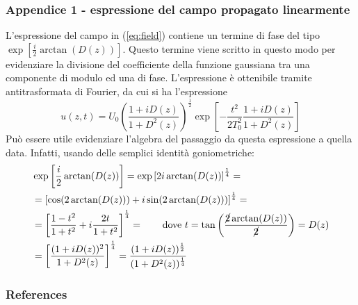 \documentclass[8pt]{beamer} %
\begin{document}
\begin{frame}[plain]
    \frametitle{Appendice 1 - espressione del campo propagato linearmente}
    L'espressione del campo in (\ref{eq:field}) contiene un termine di fase del tipo $\exp\left[\frac{i}{2} \arctan(D(z)) \right]$. Questo termine viene scritto in questo modo per evidenziare la divisione del coefficiente della funzione gaussiana tra una componente di modulo ed una di fase. L'espressione è ottenibile tramite antitrasformata di Fourier, da cui si ha l'espressione
    \begin{equation}
        u(z, t) = U_0 \left(\dfrac{1+iD(z)}{1+D^2(z)}\right)^{\frac{1}{2}} \exp\left[-\dfrac{t^2}{2T_0^2} \dfrac{1+iD(z)}{1+D^2(z)}\right]
    \end{equation}
    Può essere utile evidenziare l'algebra del passaggio da questa espressione a quella data. Infatti, usando delle semplici identità goniometriche:
    \begin{align*}
         & \exp\left[ \dfrac{i}{2} \arctan(D(z))\right] = \exp\left[ 2i \arctan(D(z))\right]^{\frac{1}{4}}=                                                                      \\
         & =\left[\cos(2\arctan(D(z))) + i \sin(2\arctan(D(z)))\right]^{\frac{1}{4}}=                                                                                            \\
         & =\left[\dfrac{1-t^2}{1+t^2} + i \dfrac{2t}{1+t^2}\right]^{\frac{1}{4}}  =  \qquad \text{dove $t=\tan\left(\dfrac{\cancel{2}\arctan(D(z))}{\cancel{2}}\right) = D(z)$} \\
         & = \left[\dfrac{(1+iD(z))^2}{1+D^2(z)}\right]^{\frac{1}{4}} = \dfrac{(1+iD(z))^{\frac{1}{2}}}{(1+D^2(z))^{\frac{1}{4}}}
    \end{align*}
\end{frame}


\begin{frame}
    \frametitle{References}
    \printbibliography
\end{frame}
\end{document}
